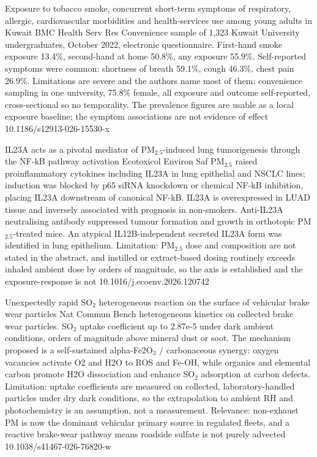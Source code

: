 \documentclass[10pt]{article}
\begin{document}
{Exposure to tobacco smoke, concurrent short-term symptoms of respiratory, allergic, cardiovascular morbidities and health-services use among young adults in Kuwait}
{BMC Health Serv Res}
{Convenience sample of 1,323 Kuwait University undergraduates, October 2022, electronic questionnaire. First-hand smoke exposure 13.4\%, second-hand at home 50.8\%, any exposure 55.9\%. Self-reported symptoms were common: shortness of breath 59.1\%, cough 46.3\%, chest pain 26.9\%. Limitations are severe and the authors name most of them: convenience sampling in one university, 75.8\% female, all exposure and outcome self-reported, cross-sectional so no temporality. The prevalence figures are usable as a local exposure baseline; the symptom associations are not evidence of effect}
{10.1186/s12913-026-15530-x}


{IL23A acts as a pivotal mediator of PM$_{2.5}$-induced lung tumorigenesis through the NF-kB pathway activation}
{Ecotoxicol Environ Saf}
{PM$_{2.5}$ raised proinflammatory cytokines including IL23A in lung epithelial and NSCLC lines; induction was blocked by p65 siRNA knockdown or chemical NF-kB inhibition, placing IL23A downstream of canonical NF-kB. IL23A is overexpressed in LUAD tissue and inversely associated with prognosis in non-smokers. Anti-IL23A neutralising antibody suppressed tumour formation and growth in orthotopic PM$_{2.5}$-treated mice. An atypical IL12B-independent secreted IL23A form was identified in lung epithelium. Limitation: PM$_{2.5}$ dose and composition are not stated in the abstract, and instilled or extract-based dosing routinely exceeds inhaled ambient dose by orders of magnitude, so the axis is established and the exposure-response is not}
{10.1016/j.ecoenv.2026.120742}


{Unexpectedly rapid SO$_2$ heterogeneous reaction on the surface of vehicular brake wear particles}
{Nat Commun}
{Bench heterogeneous kinetics on collected brake wear particles. SO$_2$ uptake coefficient up to 2.87e-5 under dark ambient conditions, orders of magnitude above mineral dust or soot. The mechanism proposed is a self-sustained alpha-Fe2O$_3$ / carbonaceous synergy: oxygen vacancies activate O2 and H2O to ROS and Fe-OH, while organics and elemental carbon promote H2O dissociation and enhance SO$_2$ adsorption at carbon defects. Limitation: uptake coefficients are measured on collected, laboratory-handled particles under dry dark conditions, so the extrapolation to ambient RH and photochemistry is an assumption, not a measurement. Relevance: non-exhaust PM is now the dominant vehicular primary source in regulated fleets, and a reactive brake-wear pathway means roadside sulfate is not purely advected}
{10.1038/s41467-026-76820-w}
\end{document}
